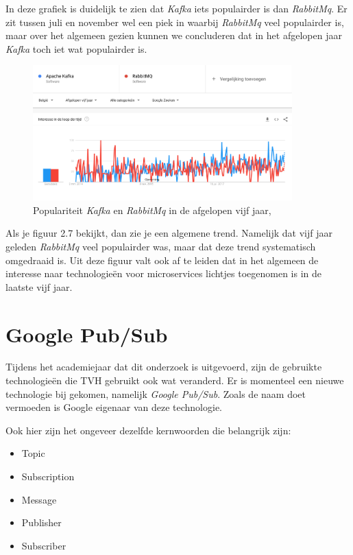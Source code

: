 In deze grafiek is duidelijk te zien dat \emph{Kafka} iets populairder is dan \emph{RabbitMq}. Er zit tussen juli en november wel een piek in waarbij \emph{RabbitMq} veel populairder is, maar over het algemeen gezien kunnen we concluderen dat in het afgelopen jaar \emph{Kafka} toch iet wat populairder is.

 \begin{figure}[h!]
    \centering
    \includegraphics[width=100mm]{../KvsRMQ2.png}
    \caption{Populariteit \emph{Kafka} en \emph{RabbitMq} in de afgelopen vijf jaar, \autocite{Trends2019}}
    
\end{figure}

Als je figuur 2.7 bekijkt, dan zie je een algemene trend. Namelijk dat vijf jaar geleden \emph{RabbitMq} veel populairder was, maar dat deze trend systematisch omgedraaid is. Uit deze figuur valt ook af te leiden dat in het algemeen de interesse naar technologieën voor microservices lichtjes toegenomen is in de laatste vijf jaar.

\autocite{Trends2019}

\section{Google Pub/Sub}
Tijdens het academiejaar dat dit onderzoek is uitgevoerd, zijn de gebruikte technologieën die TVH gebruikt ook wat veranderd. Er is momenteel een nieuwe technologie bij gekomen, namelijk \emph{Google Pub/Sub}. Zoals de naam doet vermoeden is Google eigenaar van deze technologie. 

Ook hier zijn het ongeveer dezelfde kernwoorden die belangrijk zijn:
\begin{itemize}
    \item Topic
    \item Subscription
    \item Message
    \item Publisher
    \item Subscriber
\end{itemize}


